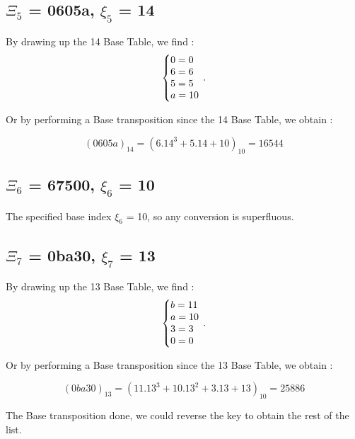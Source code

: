 \documentclass[letterpaper,10pt,english]{sphinxmanual}
\begin{document}
\subsection{$\Xi_{5}$ = 0605a, $\xi_{5}$ = 14}
By drawing up the 14 Base Table, we find :
\begin{equation}
\centering
\left\{\begin{array}{@{}l@{}}
0=0 \\
6=6 \\
5=5 \\
a=10 \\
\end{array}\right.\,.
\end{equation}

\begin{flushleft}
  Or by performing a Base transposition since the 14 Base Table, we obtain :
\end{flushleft}
\begin{equation}
(0605a)_{14}=(6.14^{3}+5.14+10)_{10}=16544
\end{equation}

\subsection{$\Xi_{6}$ = 67500, $\xi_{6}$ = 10}
The specified base index $\xi_{6}$ = 10, so any conversion is superfluous.


\subsection{$\Xi_{7}$ = 0ba30, $\xi_{7}$ = 13}
By drawing up the 13 Base Table, we find :
\begin{equation}
\centering
\left\{\begin{array}{@{}l@{}}
b=11 \\
a=10 \\
3=3 \\
0=0 \\
\end{array}\right.\,.
\end{equation}

\begin{flushleft}
  Or by performing a Base transposition since the 13 Base Table, we obtain :
\end{flushleft}
\begin{equation}
(0ba30)_{13}=(11.13^{3}+10.13^{2}+3.13+13)_{10}=25886
\end{equation}

The Base transposition done, we could reverse the key to obtain the rest of the list.
\end{document}
